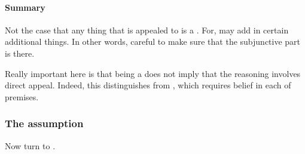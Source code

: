 \paragraph{Summary}

\begin{note}
  Not the case that any thing that is appealed to is a \requ{}.
  For, may add in certain additional things.
  In other words, careful to make sure that the subjunctive part is there.
\end{note}

\begin{note}
  Really important here is that being a \requ{} does not imply that the reasoning involves direct appeal.
  {
    \color{red}
    Indeed, this distinguishes from \citeauthor{Sgaravatti:2013wu}, which requires belief in each of premises.
  }
\end{note}

\subsubsection{The assumption}
\label{sec:two-assumpt-relat-to-requ}

\begin{note}
  Now turn to \ideaCS{}.
\end{note}

